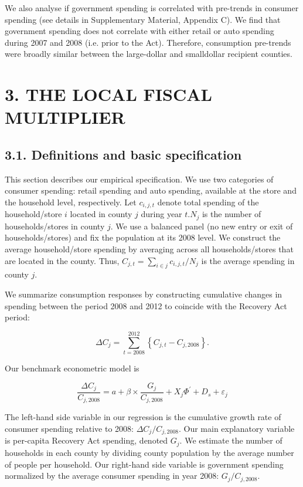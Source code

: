 \documentclass[10pt]{article}
\begin{document}
We also analyse if government spending is correlated with pre-trends in consumer spending (see details in Supplementary Material, Appendix C). We find that government spending does not correlate with either retail or auto spending during 2007 and 2008 (i.e. prior to the Act). Therefore, consumption pre-trends were broadly similar between the large-dollar and smalldollar recipient counties.

\section*{3. THE LOCAL FISCAL MULTIPLIER}
\subsection*{3.1. Definitions and basic specification}
This section describes our empirical specification. We use two categories of consumer spending: retail spending and auto spending, available at the store and the household level, respectively. Let $c_{i, j, t}$ denote total spending of the household/store $i$ located in county $j$ during year $t . N_{j}$ is the number of households/stores in county $j$. We use a balanced panel (no new entry or exit of households/stores) and fix the population at its 2008 level. We construct the average household/store spending by averaging across all households/stores that are located in the county. Thus, $C_{j, t}=\sum_{i \in j} c_{i, j, t} / N_{j}$ is the average spending in county $j$.

We summarize consumption responses by constructing cumulative changes in spending between the period 2008 and 2012 to coincide with the Recovery Act period:


\begin{equation*}
\Delta C_{j}=\sum_{t=2008}^{2012}\left\{C_{j, t}-C_{j, 2008}\right\} . \tag{3.1}
\end{equation*}


Our benchmark econometric model is


\begin{equation*}
\frac{\Delta C_{j}}{C_{j, 2008}}=a+\beta \times \frac{G_{j}}{C_{j, 2008}}+X_{j} \Phi^{\prime}+D_{s}+\varepsilon_{j} \tag{3.2}
\end{equation*}


The left-hand side variable in our regression is the cumulative growth rate of consumer spending relative to 2008: $\Delta C_{j} / C_{j, 2008}$. Our main explanatory variable is per-capita Recovery Act spending, denoted $G_{j}$. We estimate the number of households in each county by dividing county population by the average number of people per household. Our right-hand side variable is government spending normalized by the average consumer spending in year 2008: $G_{j} / C_{j, 2008}$.
\end{document}
